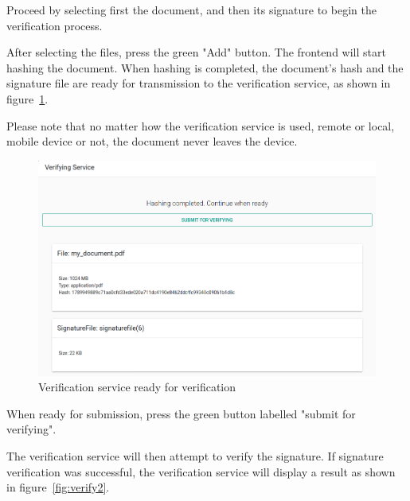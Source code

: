 Proceed by selecting first the document, and then its signature to begin the verification process.

After selecting the files, press the green "Add" button.
The frontend will start hashing the document.
When hashing is completed,
the document's hash and the signature file are ready for transmission to the verification service,
as shown in figure~\ref{fig:verify1}.

Please note that no matter how the verification service is used,
remote or local,
mobile device or not,
the document never leaves the device.

\begin{figure}[H]
    \begin{center}
        \includegraphics[width=\linewidth]{images/userguide_verify_1.png}
    \end{center}
    \caption{Verification service ready for verification}
    \label{fig:verify1}
\end{figure}

When ready for submission, press the green button labelled "submit for verifying".

The verification service will then attempt to verify the signature.
If signature verification was successful,
the verification service will display a result as shown in figure~\ref{fig:verify2}.


